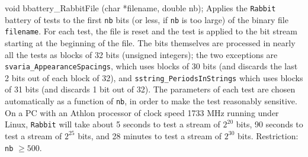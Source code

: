 void bbattery_RabbitFile (char *filename, double nb);
\endcode
  \tab Applies the {\tt Rabbit} battery of tests to the first {\tt nb} 
   bits (or less, if {\tt nb} is too large) of the binary file 
   {\tt filename}.
  For each test, the file is reset and the test is applied to the bit 
  stream starting at the beginning of the file. The bits themselves are
  processed in nearly all the tests as blocks of 32 bits (unsigned
  integers); the two exceptions are {\tt svaria\_AppearanceSpacings}, 
  which uses blocks of 30 bits (and discards the last 2 bits out of 
  each block of 32),
  and {\tt sstring\_PeriodsInStrings} which uses blocks of 31 bits (and
  discards 1 bit out of 32).  
  The parameters of each test are chosen automatically as a function of
  {\tt nb}, in order to make the test reasonably sensitive.
  On a PC with an Athlon processor of clock speed
  1733 MHz running under Linux,  {\tt Rabbit} will take about 5 seconds to
  test a stream of $2^{20}$ bits, 90 seconds to test a stream of
  $2^{25}$ bits, and 28 minutes to test a stream of
  $2^{30}$ bits.
  Restriction: {\tt nb} $\ge 500$.
  \endtab

